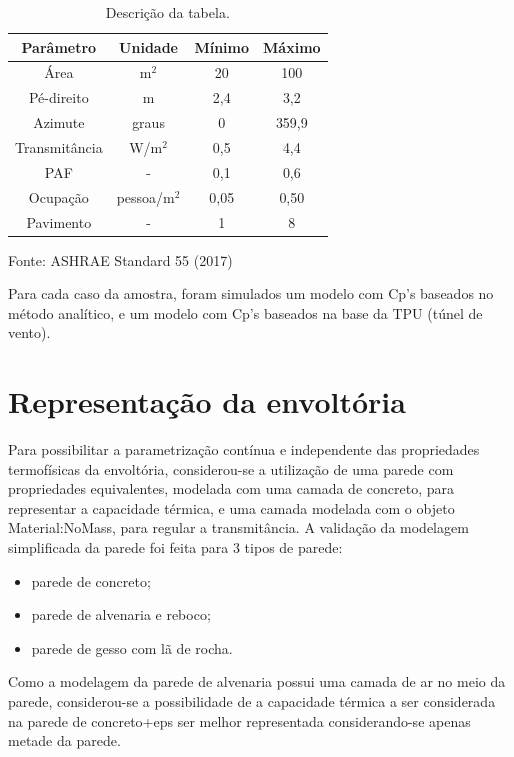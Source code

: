 \documentclass[brazil,hardcopy,openany,a5paper]{ufscthesis}
\begin{document}
		\begin{table}[h]
			\centering
			\caption{Descrição da tabela.}
			\label{table:cpmethod}
			\begin{tabular}{|c |c |c |c |}
				\hline
				\textbf{Parâmetro} & \textbf{Unidade} & \textbf{Mínimo} & \textbf{Máximo} \\
				\hline
				Área & m$^2$ & 20 & 100 \\
				\hline
				Pé-direito & m & 2,4 & 3,2 \\
				\hline
				Azimute & graus & 0 & 359,9 \\
				\hline 
				Transmitância & W/m$^2$ & 0,5 & 4,4 \\
				\hline 
				PAF & - & 0,1 & 0,6 \\
				\hline 
				Ocupação & pessoa/m$^2$ & 0,05 & 0,50 \\
				\hline 
				Pavimento & - & 1 & 8 \\
				\hline 
			\end{tabular}
			\begin{flushleft}
				Fonte: ASHRAE Standard 55 (2017)
			\end{flushleft}				
		\end{table}
				
		Para cada caso da amostra, foram simulados um modelo com Cp’s baseados no método analítico, e um modelo com Cp’s baseados na base da TPU (túnel de vento).
		
		\section{Representação da envoltória}
		
		Para possibilitar a parametrização contínua e independente das propriedades termofísicas da envoltória, considerou-se a utilização de uma parede com propriedades equivalentes, modelada com uma camada de concreto, para representar a capacidade térmica, e uma camada modelada com o objeto Material:NoMass, para regular a transmitância.
		A validação da modelagem simplificada da parede foi feita para 3 tipos de parede:
		
		\begin{itemize}
			\item parede de concreto;
			\item parede de alvenaria e reboco;
			\item parede de gesso com lã de rocha.
		\end{itemize}
		
		Como a modelagem da parede de alvenaria possui uma camada de ar no meio da parede, considerou-se a possibilidade de a capacidade térmica a ser considerada na parede de concreto+eps ser melhor representada considerando-se apenas metade da parede.
		
\end{document}
